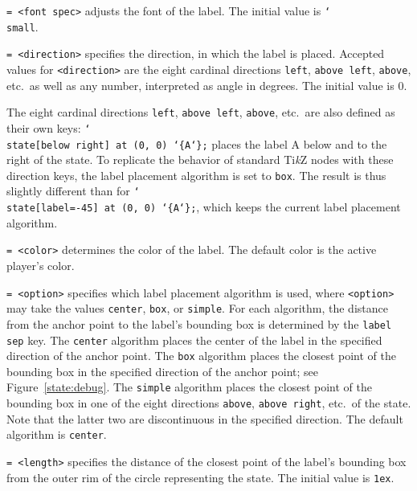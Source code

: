 \documentclass{article}
\newenvironment{desc}{\itemize[leftmargin=50pt]}{\enditemize}
\def\option#1#2{\item[\texttt{#1}] \hskip-1.5pt\texttt{#2}}
\renewcommand{\textbackslash}{\char`\\}
\def\cmd#1{\texttt{\color{cmd}\textbackslash#1}}
\def\leftbrace{\char`\{}
\def\rightbrace{\char`\}}
\def\arg#1{{\color{cmd}\leftbrace}{\color{black}#1}{\color{cmd}\rightbrace}}
\def\optarg[#1]{{\color{player1}[#1]}}
\def\TikZ{Ti\emph{k}Z\xspace}
\begin{document}
\begin{desc}
\option{font}{= <font spec>} adjusts the font of the label. The initial value is \cmd{small}.

\option{label}{= <direction>} specifies the direction, in which the label is placed. Accepted values for \texttt{<direction>} are the eight cardinal directions \texttt{left}, \texttt{above left}, \texttt{above}, etc.\ as well as any number, interpreted as angle in degrees. The initial value is $0$.

{\color{player3} The eight cardinal directions \texttt{left}, \texttt{above left}, \texttt{above}, etc.\ are also defined as their own keys: \cmd{state}\texttt{\optarg[below right]\color{xg-fg}\ at (0, 0) \arg{A};} places the label A below and to the right of the state. To replicate the behavior of standard \TikZ nodes with these direction keys, the label placement algorithm is set to \texttt{box}. The result is thus slightly different than for \cmd{state}\texttt{\optarg[label=-45]\color{xg-fg}\ at (0, 0) \arg{A};}, which keeps the current label placement algorithm.}

\option{label color}{= <color>} determines the color of the label. The default color is the active player's color.%

\option{label placement}{= <option>} specifies which label placement algorithm is used, where \texttt{<option>} may take the values \texttt{center}, \texttt{box}, or \texttt{simple}. For each algorithm, the distance from the anchor point to the label's bounding box is determined by the \texttt{label sep} key. The \texttt{center} algorithm places the center of the label in the specified direction of the anchor point. The \texttt{box} algorithm places the closest point of the bounding box in the specified direction of the anchor point; see Figure~\ref{state:debug}. The \texttt{simple} algorithm places the closest point of the bounding box in one of the eight directions \texttt{above}, \texttt{above right}, etc.~of the state. Note that the latter two are discontinuous in the specified direction. The default algorithm is \texttt{center}.

\option{label sep}{= <length>} specifies the distance of the closest point of the label's bounding box from the outer rim of the circle representing the state. The initial value is \texttt{1ex}.


\end{desc}
\end{document}
